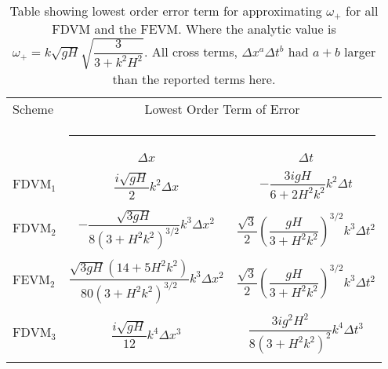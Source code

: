 \begin{table}
	\centering   
	\begin{tabular}{l  c  c}
		Scheme & \multicolumn{2}{c}{Lowest Order Term of Error}\\
		&  \multicolumn{2}{l}{\rule{0.95\textwidth}{0.4pt}} \\
		& $\Delta x$&$\Delta t$\\
		\hline && \\
		$\text{FDVM}_1$& $\dfrac{i\sqrt{gH}}{2}k^2\Delta x$ & $-\dfrac{3igH}{6 + 2H^2k^2}k^2\Delta t$ \\ & & \\
		$\text{FDVM}_2$& $-\dfrac{\sqrt{3gH}}{8\left(3 + H^2k^2\right)^{3/2}}k^3\Delta x^2$ & $\dfrac{\sqrt{3}}{2}\left(\dfrac{gH}{3 + H^2k^2}\right)^{3/2} k^3\Delta t^2$ \\ & & \\
		$\text{FEVM}_2$& $\dfrac{\sqrt{3gH}\left(14 + 5H^2k^2\right)}{80\left(3 + H^2k^2\right)^{3/2}}k^3\Delta x^2$ & $\dfrac{\sqrt{3}}{2}\left(\dfrac{gH}{3 + H^2k^2}\right)^{3/2}k^3\Delta t^2$  \\ & & \\
		$\text{FDVM}_3$& $\dfrac{i\sqrt{gH}}{12}k^4\Delta x^3$ & $\dfrac{3ig^2H^2}{8\left(3 + H^2k^2\right)^2} k^4\Delta t^3$  \\ & & \\ 
	\end{tabular}
	\caption{Table showing lowest order error term for approximating $\omega_+$ for all FDVM and the FEVM. Where the analytic value is  $\omega_+ = k\sqrt{gH}\sqrt{\dfrac{3}{3 + k^2H^2}}$. All cross terms, $\Delta x^a \Delta t^b$ had $a +b$ larger than the reported terms here.}
	\label{tab:Wfactor} 
\end{table}
